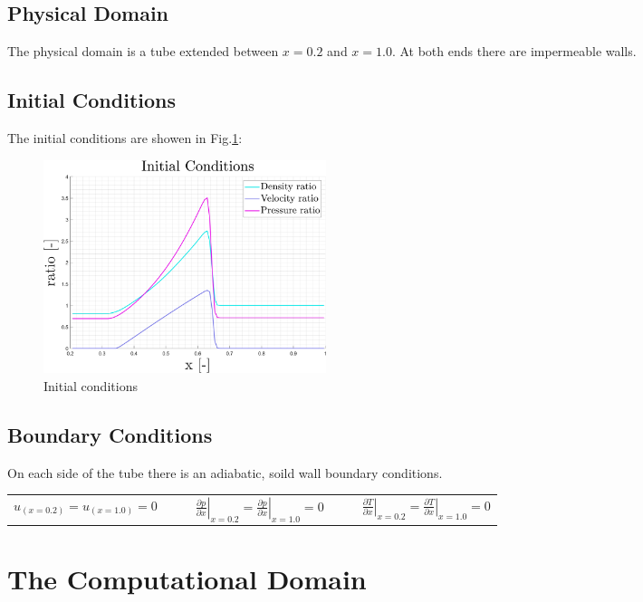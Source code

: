 \documentclass[11pt, a4paper]{article}
\begin{document}
\subsection{Physical Domain}
The physical domain is a tube extended between $x=0.2$ and $x=1.0$. At both ends there are impermeable walls.

\subsection{Initial Conditions}
The initial conditions are showen in Fig.\ref{fig: initial conditions}:
\begin{figure}[H]
    \centering
    \includegraphics[width=0.4\textwidth]{images/Initial Conditions.png}
    \caption{Initial conditions}
    \label{fig: initial conditions}
\end{figure}

\subsection{Boundary Conditions}
On each side of the tube there is an adiabatic, soild wall boundary conditions. 
\begin{table}[H]
    \centering
    \begin{tabular}{cc||ccc||cc}
        $u_{\left(x=0.2\right)}=u_{\left(x=1.0\right)}=0$ &&& $\displaystyle\left.\frac{\partial p}{\partial x}\right|_{x=0.2}=\left.\frac{\partial p}{\partial x}\right|_{x=1.0}=0$ &&& $\displaystyle\left.\frac{\partial T}{\partial x}\right|_{x=0.2}=\left.\frac{\partial T}{\partial x}\right|_{x=1.0}=0$
    \end{tabular}
\end{table}

\section{The Computational Domain}
\end{document}

